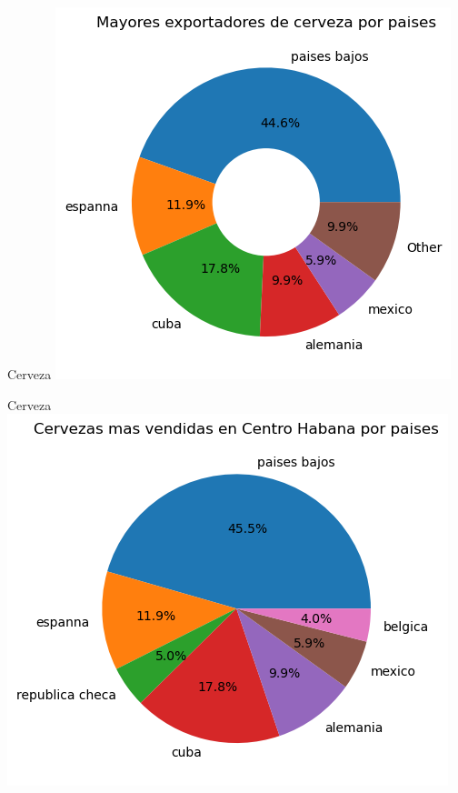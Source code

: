 \documentclass{beamer}
\begin{document}
\begin{frame}{Cerveza}
    \includegraphics[scale=0.5]{Cerv_mayor_exportador.png}
    \end{frame}

\begin{frame}{Cerveza}
    \includegraphics[scale=0.5]{Cerv_mas_vendida_por_pais.png}
    \end{frame}
\end{document}

